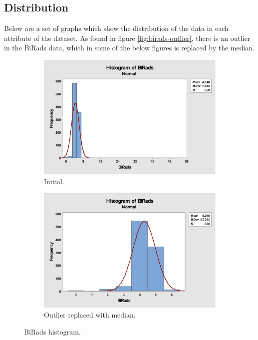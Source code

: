 \documentclass[12pt]{article}
\begin{document}
    \subsection{Distribution}
      Below are a set of graphs which show the distribution of the data in each attribute of the dataset. As found in figure \ref{fig:birads-outlier}, there is an outlier in the BiRads data, which in some of the below figures is replaced by the median.
  \newpage
    \begin{figure}[H]
      \begin{subfigure}[b]{0.45\textwidth}
        \includegraphics[width=\textwidth]{birads-histogram}
        \caption{Initial.}
        \label{fig:birads-histogram}
      \end{subfigure}
      \hfill
      \begin{subfigure}[b]{0.45\textwidth}
        \includegraphics[width=\textwidth]{birads-histogram-no55}
        \caption{Outlier replaced with median.}
        \label{fig:birads-histogram-no55}
      \end{subfigure}
      \caption{BiRads histogram.}
    \end{figure}
\end{document}
